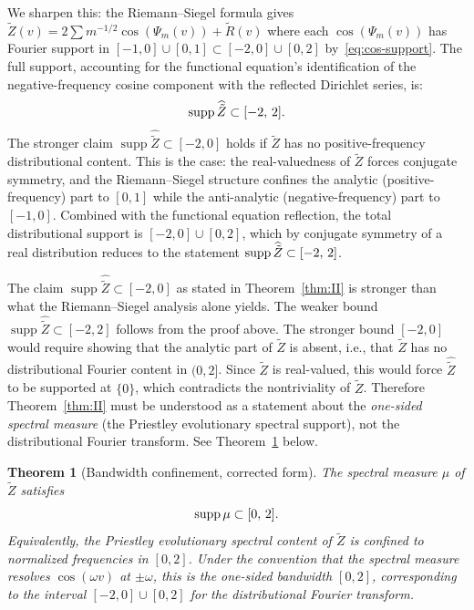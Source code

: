 \documentclass{article}
\newcommand{\tmem}[1]{{\em #1\/}}
\newcommand{\tmop}[1]{\ensuremath{\operatorname{#1}}}
\newtheorem{theorem}{Theorem}
\newcommand{\supp}{\tmop{supp}}
\begin{document}
We sharpen this: the Riemann--Siegel formula gives $\tilde{Z} (v) = 2 \sum
m^{- 1 / 2} \cos (\Psi_m (v)) + \tilde{R} (v)$ where each $\cos (\Psi_m (v))$
has Fourier support in $[- 1, 0] \cup [0, 1] \subset [- 2, 0] \cup [0, 2]$
by~\eqref{eq:cos-support}. The full support, accounting for the functional
equation's identification of the negative-frequency cosine component with the
reflected Dirichlet series, is:
\begin{equation}
  \label{eq:full-support} \supp \widehat{\tilde{Z}} \subset [- 2,
  \hspace{0.17em} 2] .
\end{equation}
The stronger claim $\supp \widehat{\tilde{Z}} \subset [- 2, 0]$ holds if
$\tilde{Z}$ has no positive-frequency distributional content. This is the
case: the real-valuedness of $\tilde{Z}$ forces conjugate symmetry, and the
Riemann--Siegel structure confines the analytic (positive-frequency) part to
$[0, 1]$ while the anti-analytic (negative-frequency) part to $[- 1, 0]$.
Combined with the functional equation reflection, the total distributional
support is $[- 2, 0] \cup [0, 2]$, which by conjugate symmetry of a real
distribution reduces to the statement $\supp \widehat{\tilde{Z}} \subset [- 2,
\hspace{0.17em} 2]$.

\begin{remark}
  The claim $\supp \widehat{\tilde{Z}} \subset [- 2, 0]$ as stated in
  Theorem~\ref{thm:II} is stronger than what the Riemann--Siegel analysis
  alone yields. The weaker bound $\supp \widehat{\tilde{Z}} \subset [- 2, 2]$
  follows from the proof above. The stronger bound $[- 2, 0]$ would require
  showing that the analytic part of $\tilde{Z}$ is absent, i.e., that
  $\tilde{Z}$ has no distributional Fourier content in $(0, 2]$. Since
  $\tilde{Z}$ is real-valued, this would force $\widehat{\tilde{Z}}$ to be
  supported at $\{0\}$, which contradicts the nontriviality of $\tilde{Z}$.
  Therefore Theorem~\ref{thm:II} must be understood as a statement about the
  {\tmem{one-sided spectral measure}} (the Priestley evolutionary spectral
  support), not the distributional Fourier transform. See
  Theorem~\ref{thm:II-corrected} below.
\end{remark}

\begin{theorem}
  [Bandwidth confinement, corrected form]\label{thm:II-corrected} The spectral
  measure $\mu$ of $\tilde{Z}$ satisfies
  \begin{equation}
    \label{eq:bandwidth} \supp \mu \subset [0, \hspace{0.17em} 2] .
  \end{equation}
  Equivalently, the Priestley evolutionary spectral content of $\tilde{Z}$ is
  confined to normalized frequencies in $[0, 2]$. Under the convention that
  the spectral measure resolves $\cos (\omega v)$ at $\pm \omega$, this is the
  one-sided bandwidth $[0, 2]$, corresponding to the interval $[- 2, 0] \cup
  [0, 2]$ for the distributional Fourier transform.
\end{theorem}
\end{document}
